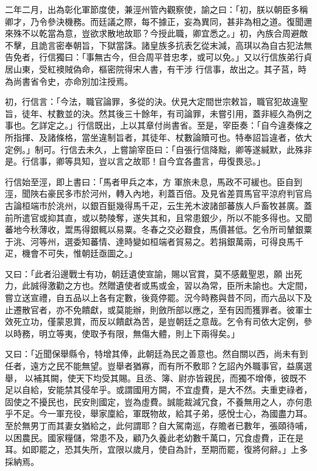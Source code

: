 \begin{pinyinscope}
 二年二月，出為彰化軍節度使，兼涇州管內觀察使，諭之曰：「初，朕以朝臣多稱卿才，乃令參決機務。而廷議之際，每不據正，妄為異同，甚非為相之道。復聞邇來殊不以乾當為意，豈欲求散地故耶？今授此職，卿宜悉之。」初，內族合周避敵不擊，且詭言密奉朝旨，下獄當誅。諸皇族多抗表乞從末減，高琪以為自古犯法無告免者，行信獨曰：「事無古今，但合周平昔忠孝，或可以免。」又以行信族弟行貞居山東，受紅襖賊偽命，樞密院得宋人書，有干涉
 行信事，故出之。其子莒，時為尚書省令史，亦命別加注授焉。



 初，行信言：「今法，職官論罪，多從的決。伏見大定間世宗敕旨，職官犯故違聖旨，徒年、杖數並的決。然其後三十餘年，有司論罪，未嘗引用，蓋非經久為例之事也。乞詳定之。」行信既出，上以其章付尚書省。至是，宰臣奏：「自今違奏條之所指揮、及諸條格，當坐違制旨者，其徒年、杖數論贖可也。特奉詔旨違者，依大定例。」制可。行信去未久，上嘗諭宰臣曰：「自張行信降黜，卿等遂緘默，此殊非是。行信事，卿等具知，豈以言之故耶！自今宜各盡言，毋復畏忌。」



 行信始至涇，即上書曰：「馬者甲兵之本，方
 軍旅未息，馬政不可緩也。臣自到涇，聞陜右豪民多市於河州，轉入內地，利蓋百倍。及見省差買馬官平涼府判官烏古論桓端市於洮州，以銀百鋌幾得馬千疋，云生羌木波諸部蕃族人戶畜牧甚廣。蓋前所遣官或抑其直，或以勢陵奪，遂失其和，且常患銀少，所以不能多得也。又聞蕃地今秋薄收，鬻馬得銀輒以易粟。冬春之交必艱食，馬價甚低。乞令所司輦銀粟于洮、河等州，選委知蕃情、達時變如桓端者貿易之。若捐銀萬兩，可得良馬千疋，機會不可失，惟朝廷亟圖之。」



 又曰：「此者沿邊戰士有功，朝廷遺使宣諭，賜以官賞，莫不感戴聖恩，願
 出死力，此誠得激勸之方也。然贈遺使者或馬或金，習以為常，臣所未諭也。大定間，嘗立送宣禮，自五品以上各有定數，後竟停罷。況今時務與昔不同，而六品以下及止遷散官者，亦不免饋獻，或莫能辦，則斂所部以應之，至有因而獲罪者。彼軍士效死立功，僅蒙恩賞，而反以饋獻為苦，是豈朝廷之意哉。乞令有司依大定例，參以時務，明立等夷，使取予有限，無傷大體，則上下兩得矣。」



 又曰：「近聞保舉縣令，特增其俸，此朝廷為民之善意也。然自關以西，尚未有到任者，遠方之民不能無望。豈舉者猶寡，而有所不敷耶？乞詔內外職事官，益廣選舉，
 以補其闕，使天下均受其賜。且丞、簿、尉亦皆親民，而獨不增俸，彼既不足以自給，安能禁其侵牟乎。或謂國用方闕，不宜虛費，是大不然。夫重吏祿者，固使之不擾民也，民安則國定，豈為虛費。誠能裁減冗食，不養無用之人，亦何患乎不足。今一軍充役，舉家廩給，軍既物故，給其子弟，感悅士心，為國盡力耳。至於無男丁而其妻女猶給之，此何謂耶？自大駕南巡，存贍者已數年，張頤待哺，以困農民。國家糧儲，常患不及，顧乃久養此老幼數千萬口，冗食虛費，正在是耳。如即罷之，恐其失所，宜限以歲月，使自為計，至期而罷，復將何辭。」上多採納焉。




\end{pinyinscope}
